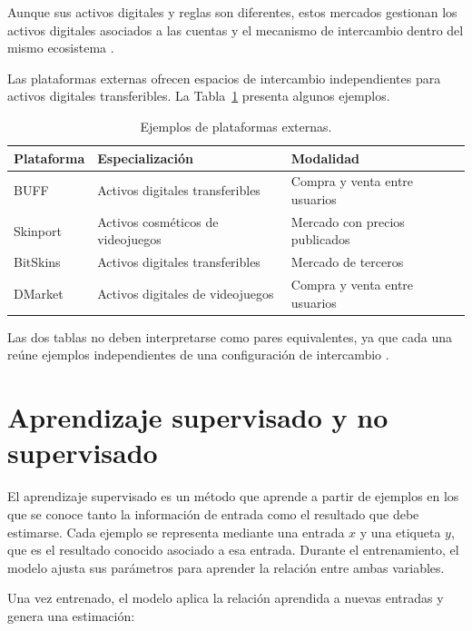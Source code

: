 Aunque sus activos digitales y reglas son diferentes, estos mercados gestionan los activos digitales asociados a las cuentas y el mecanismo de intercambio dentro del mismo ecosistema \cite{steamMarketFAQ,robloxMarketplace,blizzardAuctionHouse,eveMarketOrders}.

Las plataformas externas ofrecen espacios de intercambio independientes para activos digitales transferibles. La Tabla~\ref{tab:plataformas-externas} presenta algunos ejemplos.

\begin{table}[H]
\centering
\small
\begin{tabularx}{\textwidth}{@{}p{}p{}X@{}}
\toprule
\textbf{Plataforma} & \textbf{Especialización} & \textbf{Modalidad} \\
\midrule
BUFF & Activos digitales transferibles & Compra y venta entre usuarios \\
Skinport & Activos cosméticos de videojuegos & Mercado con precios publicados \\
BitSkins & Activos digitales transferibles & Mercado de terceros \\
DMarket & Activos digitales de videojuegos & Compra y venta entre usuarios \\
\bottomrule
\end{tabularx}
\caption{Ejemplos de plataformas externas.}
\label{tab:plataformas-externas}
\end{table}

Las dos tablas no deben interpretarse como pares equivalentes, ya que cada una reúne ejemplos independientes de una configuración de intercambio \cite{buffMarketplace,skinportItemsApi,bitskinsMarketplace,dmarketMarketplace}.
\section{Aprendizaje supervisado y no supervisado}
\label{sec:estado-arte-supervisado}

El aprendizaje supervisado es un método que aprende a partir de ejemplos en los que se conoce tanto la información de entrada como el resultado que debe estimarse. Cada ejemplo se representa mediante una entrada $x$ y una etiqueta $y$, que es el resultado conocido asociado a esa entrada. Durante el entrenamiento, el modelo ajusta sus parámetros para aprender la relación entre ambas variables.

Una vez entrenado, el modelo aplica la relación aprendida a nuevas entradas y genera una estimación:

